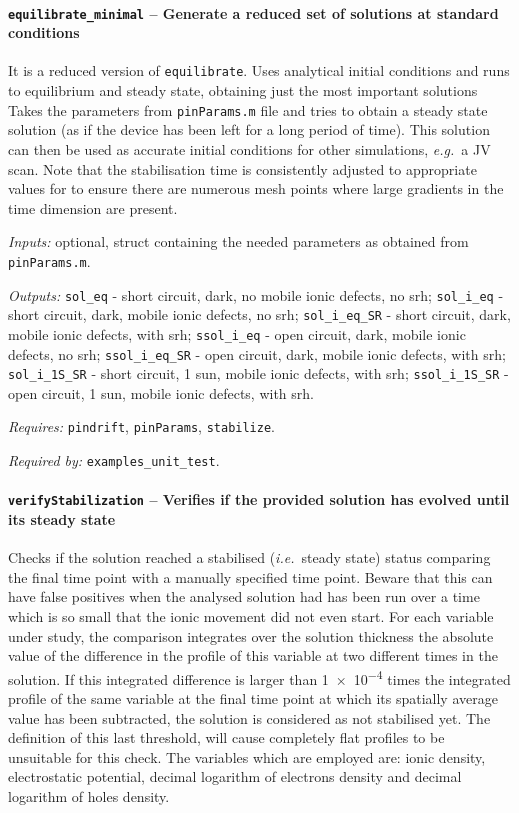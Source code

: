 		\paragraph{\texttt{equilibrate\_minimal} -- Generate a reduced set of solutions at standard conditions}
		It is a reduced version of \texttt{equilibrate}.
		Uses analytical initial conditions and runs to equilibrium and steady state, obtaining just the most important solutions
		Takes the parameters from \texttt{pin\-Params.m} file and tries
		to obtain a steady state solution (as if the device has been left for
		a long period of time). This solution can then be used as accurate
		initial conditions for other simulations, \textsl{e.g.}\ a JV scan.
		Note that the stabilisation time is consistently adjusted to appropriate values for to
		ensure there are numerous mesh points where large gradients in the time
		dimension are present.

		\textit{Inputs:} optional, struct containing the needed parameters as obtained
		from \texttt{pin\-Params.m}.

		\textit{Outputs:} \texttt{sol\_eq} - short circuit, dark, no mobile ionic defects, no \gls{srh};
		\texttt{sol\_i\_eq} - short circuit, dark, mobile ionic defects, no \gls{srh};
		\texttt{sol\_i\_eq\_SR} - short circuit, dark, mobile ionic defects, with \gls{srh};
		\texttt{ssol\_i\_eq} - open circuit, dark, mobile ionic defects, no \gls{srh};
		\texttt{ssol\_i\_eq\_SR} - open circuit, dark, mobile ionic defects, with \gls{srh};
		\texttt{sol\_i\_1S\_SR} - short circuit, 1 sun, mobile ionic defects, with \gls{srh};
		\texttt{ssol\_i\_1S\_SR} - open circuit, 1 sun, mobile ionic defects, with \gls{srh}.

		\textit{Requires:} \texttt{pin\-drift}, \texttt{pinParams}, \texttt{stabilize}.

		\textit{Required by:} \texttt{examples\_unit\_test}.

		\paragraph{\texttt{verify\-Stabilization} -- Verifies if the provided solution has evolved until its steady state}\label{verifyStabilization}
		Checks if the solution reached a stabilised (\textsl{i.e.}\ steady state) status comparing the final time point with a manually specified time point. Beware that this can have false positives when the analysed solution had
		has been run over a time which is so small that the ionic movement did not even start.
		For each variable under study, the comparison integrates over the solution thickness the absolute value of the difference in the profile of this variable at two different times in the solution.
		If this integrated difference is larger than \num{1e-4} times the integrated profile of the same variable at the final time point at which its spatially average value has been subtracted, the solution is considered as not stabilised yet.
		The definition of this last threshold, will cause completely flat profiles to be unsuitable for this check.
		The variables which are employed are: ionic density, electrostatic potential, decimal logarithm of electrons density and decimal logarithm of holes density.

